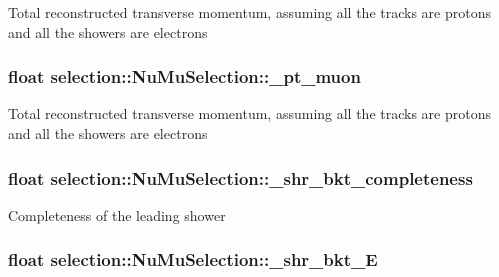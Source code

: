 Total reconstructed transverse momentum, assuming all the tracks are protons and all the showers are electrons \hypertarget{classselection_1_1NuMuSelection_abcba7cd55395fa3ae3822f84abad4d73}{
\subsubsection[{\-\_\-pt\-\_\-muon}]{\setlength{\rightskip}{0pt plus 5cm}float selection\-::\-Nu\-Mu\-Selection\-::\-\_\-pt\-\_\-muon\hspace{0.3cm}{\ttfamily [private]}}}\label{classselection_1_1NuMuSelection_abcba7cd55395fa3ae3822f84abad4d73}
Total reconstructed transverse momentum, assuming all the tracks are protons and all the showers are electrons \hypertarget{classselection_1_1NuMuSelection_a18224668e51654b8322757c2db5d8b9d}{
\subsubsection[{\-\_\-shr\-\_\-bkt\-\_\-completeness}]{\setlength{\rightskip}{0pt plus 5cm}float selection\-::\-Nu\-Mu\-Selection\-::\-\_\-shr\-\_\-bkt\-\_\-completeness\hspace{0.3cm}{\ttfamily [private]}}}\label{classselection_1_1NuMuSelection_a18224668e51654b8322757c2db5d8b9d}
Completeness of the leading shower \hypertarget{classselection_1_1NuMuSelection_aa6e475979c9554cb14bf7a082385a128}{
\subsubsection[{\-\_\-shr\-\_\-bkt\-\_\-\-E}]{\setlength{\rightskip}{0pt plus 5cm}float selection\-::\-Nu\-Mu\-Selection\-::\-\_\-shr\-\_\-bkt\-\_\-\-E\hspace{0.3cm}{\ttfamily [private]}}}\label{classselection_1_1NuMuSelection_aa6e475979c9554cb14bf7a082385a128}
